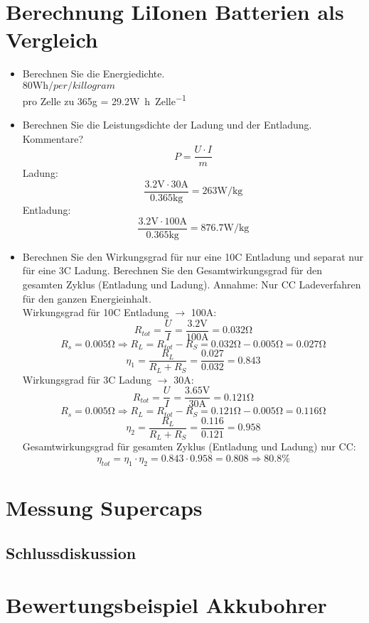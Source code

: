 \documentclass[a4,paper,fleqn]{article}
\begin{document}
\section{Berechnung LiIonen Batterien als Vergleich}
\begin{itemize}
\item Berechnen Sie die Energiedichte. \\
    $80\si{\watt\hour/per/killogram}$ \\
    pro Zelle zu 365\si{\gram} = 29.2\si{\watt\hour\per Zelle}
\item Berechnen Sie die Leistungsdichte der Ladung und der Entladung. 
Kommentare? \\
    \[ P = \frac{U \cdot I}{m} \]
    Ladung: 
    \[ \frac{3.2\si{\volt} \cdot 30\si{\ampere}}{0.365\si{\kilogram}} = 263 \si{\watt\per\kilogram} \]
    Entladung: 
    \[ \frac{3.2\si{\volt} \cdot 100\si{\ampere}}{0.365\si{\kilogram}} = 876.7 \si{\watt\per\kilogram} \]
\item  Berechnen Sie den Wirkungsgrad für nur eine 10C Entladung und separat 
nur für eine 3C Ladung.  Berechnen Sie den Gesamtwirkungsgrad für den 
gesamten Zyklus (Entladung und Ladung).  Annahme: Nur CC Ladeverfahren für 
den ganzen Energieinhalt. \\
    Wirkungsgrad für 10C Entladung $\to$ 100\si{\ampere}: 
    \[ R_{tot} = \frac{U}{I} = \frac{3.2\si{\volt}}{100\si{\ampere}} 
    = 0.032\si{\ohm} \]
    \[ R_s = 0.005\si{\ohm} \Rightarrow R_L 
    = R_{tot} - R_S = 0.032\si{\ohm} - 0.005\si{\ohm} = 0.027\si{\ohm} \]
    \[ \eta_1 = \frac{R_L}{R_L + R_S} = \frac{0.027}{0.032} = 0.843 \]
    Wirkungsgrad für 3C Ladung $\to$ 30\si{\ampere}: 
    \[ R_{tot} = \frac{U}{I} = \frac{3.65\si{\volt}}{30\si{\ampere}} 
    = 0.121\si{\ohm} \]
    \[ R_s = 0.005\si{\ohm} \Rightarrow R_L 
    = R_{tot} - R_S = 0.121\si{\ohm} - 0.005\si{\ohm} = 0.116\si{\ohm} \]
    \[ \eta_2 = \frac{R_L}{R_L + R_S} = \frac{0.116}{0.121} = 0.958 \]
    Gesamtwirkungsgrad für gesamten Zyklus (Entladung und Ladung) nur CC: \\
    \[ \eta_{tot} = \eta_1 \cdot \eta_2 = 0.843 \cdot 0.958 
    = 0.808 \Rightarrow 80.8\% \]
\end{itemize}

\section{Messung Supercaps}
\subsection{Schlussdiskussion}

\section{Bewertungsbeispiel Akkubohrer}
\end{document}
